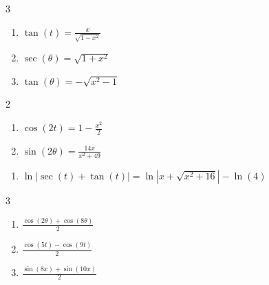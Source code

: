 \documentclass{ximera}
\begin{document}
\begin{multicols}{3}
\begin{enumerate}
\setcounter{enumi}{\value{HW}}

\addtocounter{enumi}{19}

\item  $\tan(t) = \frac{x}{\sqrt{1 - x^2}}$

\item  $\sec(\theta) = \sqrt{1+x^2}$ 

\item  $\tan(\theta) = -\sqrt{x^2-1}$ 

\setcounter{HW}{\value{enumi}}
\end{enumerate}

\end{multicols}

\begin{multicols}{2}
\begin{enumerate}

\setcounter{enumi}{\value{HW}}

\item $\cos(2t) = 1 - \frac{x^{2}}{2}$

\item $\sin(2\theta) = \frac{14x}{x^{2} + 49}$

\setcounter{HW}{\value{enumi}}

\end{enumerate}

\end{multicols}

\begin{enumerate}

\setcounter{enumi}{\value{HW}}
\item $\ln|\sec(t) + \tan(t)| = \ln |x + \sqrt{x^{2} + 16}| - \ln(4)$ 

\setcounter{HW}{\value{enumi}}

\end{enumerate}

\begin{multicols}{3}

\begin{enumerate}

\setcounter{enumi}{\value{HW}}

\addtocounter{enumi}{11}

\item $\frac{\cos(2\theta) + \cos(8\theta)}{2}$
\item $\frac{\cos(5t) - \cos(9t)}{2}$
\item $\frac{\sin(8x) + \sin(10x)}{2}$

\setcounter{HW}{\value{enumi}}

\end{enumerate}

\end{multicols}
\end{document}
